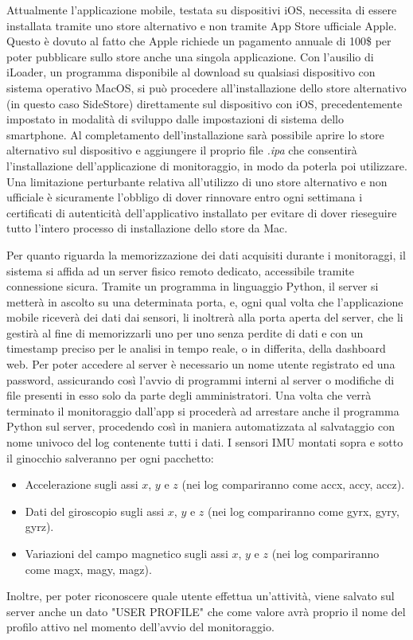 \documentclass[target=bach,aauheader=,style=]{thud}
\begin{document}
Attualmente l'applicazione mobile, testata su dispositivi iOS, necessita di essere installata tramite uno store alternativo e non tramite App Store ufficiale Apple. Questo è dovuto al fatto che Apple richiede un pagamento annuale di 100\$ per poter pubblicare sullo store anche una singola applicazione. Con l'ausilio di iLoader, un programma disponibile al download su qualsiasi dispositivo con sistema operativo MacOS, si può procedere all'installazione dello store alternativo (in questo caso SideStore) direttamente sul dispositivo con iOS, precedentemente impostato in modalità di sviluppo dalle impostazioni di sistema dello smartphone. Al completamento dell'installazione sarà possibile aprire lo store alternativo sul dispositivo e aggiungere il proprio file \textit{.ipa} che consentirà l'installazione dell'applicazione di monitoraggio, in modo da poterla poi utilizzare. Una limitazione perturbante relativa all'utilizzo di uno store alternativo e non ufficiale è sicuramente l'obbligo di dover rinnovare entro ogni settimana i certificati di autenticità dell'applicativo installato per evitare di dover rieseguire tutto l'intero processo di installazione dello store da Mac. 

Per quanto riguarda la memorizzazione dei dati acquisiti durante i monitoraggi, il sistema si affida ad un server fisico remoto dedicato, accessibile tramite connessione sicura. Tramite un programma in linguaggio Python, il server si metterà in ascolto su una determinata porta, e, ogni qual volta che l'applicazione mobile riceverà dei dati dai sensori, li inoltrerà alla porta aperta del server, che li gestirà al fine di memorizzarli uno per uno senza perdite di dati e con un timestamp preciso per le analisi in tempo reale, o in differita, della dashboard web. Per poter accedere al server è necessario un nome utente registrato ed una password, assicurando così l'avvio di programmi interni al server o modifiche di file presenti in esso solo da parte degli amministratori. Una volta che verrà terminato il monitoraggio dall'app si procederà ad arrestare anche il programma Python sul server, procedendo così in maniera automatizzata al salvataggio con nome univoco del log contenente tutti i dati. I sensori IMU montati sopra e sotto il ginocchio salveranno per ogni pacchetto:

\begin{itemize}
    \item Accelerazione sugli assi $x$, $y$ e $z$ (nei log compariranno come accx, accy, accz).
    \item Dati del giroscopio sugli assi $x$, $y$ e $z$ (nei log compariranno come gyrx, gyry, gyrz).
    \item Variazioni del campo magnetico sugli assi $x$, $y$ e $z$ (nei log compariranno come magx, magy, magz).
\end{itemize}
Inoltre, per poter riconoscere quale utente effettua un'attività, viene salvato sul server anche un dato "USER PROFILE" che come valore avrà proprio il nome del profilo attivo nel momento dell'avvio del monitoraggio.
\end{document}
